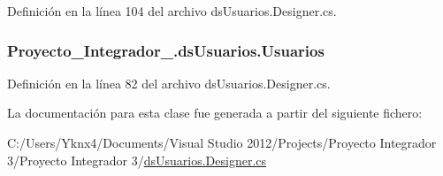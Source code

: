 Definición en la línea 104 del archivo ds\-Usuarios.\-Designer.\-cs.

\hypertarget{class_proyecto___integrador__3_1_1ds_usuarios_a79d1cfd31914c2c5cfda39b62381478b}{
\subsubsection[{Usuarios}]{ Proyecto\-\_\-\-Integrador\-\_.\-ds\-Usuarios.\-Usuarios\hspace{0.3cm}{\ttfamily [get]}}}\label{class_proyecto___integrador__3_1_1ds_usuarios_a79d1cfd31914c2c5cfda39b62381478b}


Definición en la línea 82 del archivo ds\-Usuarios.\-Designer.\-cs.



La documentación para esta clase fue generada a partir del siguiente fichero\-:\begin{DoxyCompactItemize}
\item 
C\-:/\-Users/\-Yknx4/\-Documents/\-Visual Studio 2012/\-Projects/\-Proyecto Integrador 3/\-Proyecto Integrador 3/\hyperlink{ds_usuarios_8_designer_8cs}{ds\-Usuarios.\-Designer.\-cs}\end{DoxyCompactItemize}
